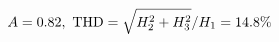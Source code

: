 \documentclass[preview]{standalone}
\begin{document}
\begin{align*}
\special{dvisvgm:raw <g id='unique000'>}A=0.82,\ \text{THD}=\sqrt{H_2^2+H_3^2}/H_1=14.8\%\special{dvisvgm:raw </g>}
\end{align*}
\end{document}
